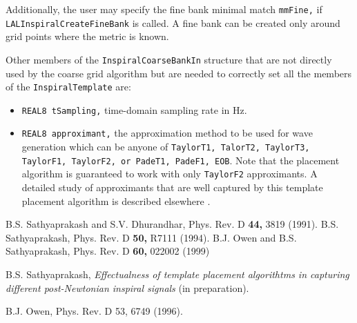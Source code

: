 Additionally, the user may specify the fine bank minimal match
\texttt{mmFine,} if \texttt{LALInspiralCreateFineBank} is called.
A fine bank can be created only around grid points where the
metric is known.

Other members of the \texttt{InspiralCoarseBankIn} structure that
are not directly used by the coarse grid algorithm but are needed to
correctly set all the members of the \texttt{InspiralTemplate} are:

\begin{itemize}
\item \texttt {REAL8 tSampling,} time-domain sampling rate in Hz.
\item \texttt {REAL8 approximant,} the approximation method to be used
for wave generation which can be anyone of \texttt{TaylorT1, TalorT2,
TaylorT3, TaylorF1, TaylorF2, {\rm or} PadeT1, PadeF1, EOB}. Note that
the placement algorithm is guaranteed to work with only \texttt {TaylorF2}
approximants. A detailed study of approximants that are well captured by
this template placement algorithm is described elsewhere \cite{Sathyaprakash
2001a}.
\end{itemize}

\newpage

\begin{thebibliography}{}
 B.S. Sathyaprakash and 
S.V. Dhurandhar, Phys. Rev. D {\bf 44,} 3819 (1991).
 B.S. Sathyaprakash, Phys. Rev. D {\bf 50,} R7111
(1994).
 B.J. Owen and B.S. Sathyaprakash, 
Phys. Rev. D {\bf 60,} 022002 (1999)

 B.S. Sathyaprakash, {\it Effectualness of
template placement algorithtms in capturing different post-Newtonian
inspiral signals} (in preparation).

 B.J. Owen, Phys. Rev. D 53, 6749 (1996).
\end{thebibliography}
